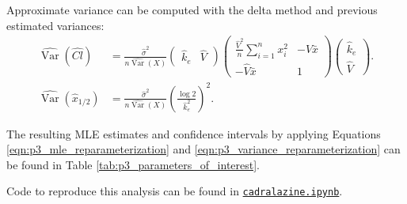 \documentclass[letterpaper,11pt]{article}
\begin{document}
\begin{enumerate}
\begin{enumerate}
\begin{description}
      Approximate variance can be computed with the delta method and previous
      estimated variances:
      \begin{align}
        \hat{\operatorname{Var}}\left(\hat{Cl}\right)
        &=\frac{\hat{\sigma}^2}{n\hat{\operatorname{Var}}\left(X\right)}
          \begin{pmatrix}
            \hat{k}_e & \hat{V}
          \end{pmatrix} \begin{pmatrix}
            \frac{\hat{V}^2}{n}\sum_{i=1}^nx_i^2 & -\hat{V}\bar{x} \\
            -\hat{V}\bar{x} & 1
          \end{pmatrix}
        \begin{pmatrix}
          \hat{k}_e \\ \hat{V}
        \end{pmatrix}.
        \nonumber\\
        \hat{\operatorname{Var}}\left(\hat{x}_{1/2}\right)
        &= \frac{\hat{\sigma}^2}{n\hat{\operatorname{Var}}\left(X\right)}
          \left(\frac{\log 2}{\hat{k}_e^2}\right)^2.
          \label{eqn:p3_variance_reparameterization}
      \end{align}

      The resulting MLE estimates and confidence intervals by applying Equations
      \ref{eqn:p3_mle_reparameterization} and
      \ref{eqn:p3_variance_reparameterization} can be found in Table
      \ref{tab:p3_parameters_of_interest}.

      Code to reproduce this analysis can be found in
      \href{http://nbviewer.jupyter.org/github/ppham27/stat570/blob/master/hw6/cadralazine.ipynb}{\texttt{cadralazine.ipynb}}.
    \end{description}
  \end{enumerate}
\end{enumerate}
\end{document}
